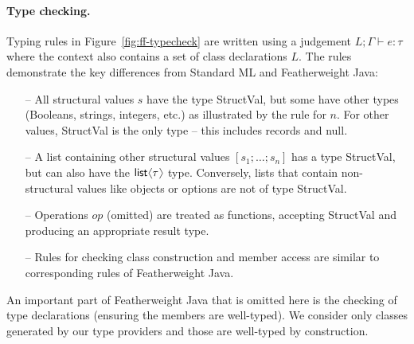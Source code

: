 \documentclass[10pt,preprint,blind,clearpagebib]{sigplanconf}
\newcommand{\langl}{\begin{picture}(4.5,7)
\put(1.1,2.5){\rotatebox{60}{\line(1,0){5.5}}}
\put(1.1,2.5){\rotatebox{300}{\line(1,0){5.5}}}
\end{picture}}
\newcommand{\rangl}{\begin{picture}(4.5,7)
\put(.9,2.5){\rotatebox{120}{\line(1,0){5.5}}}
\put(.9,2.5){\rotatebox{240}{\line(1,0){5.5}}}
\end{picture}}
\newcommand{\kvd}[1]{\textnormal{\textcolor{kvdclr}{\sffamily #1}}}
\newcommand{\ident}[1]{\textnormal{\sffamily #1}}
\begin{document}
\paragraph{Type checking.} 
Typing rules in Figure~\ref{fig:ff-typecheck} are written using a judgement
$L; \Gamma \vdash e : \tau$ where the context also contains a set of class declarations $L$.
The rules demonstrate the key differences from Standard ML and Featherweight Java:
%
\begin{itemize}
\item[--] All structural values $s$ have the type \ident{StructVal}, but some have other types
  (Booleans, strings, integers, etc.) as illustrated by the rule for $n$.
  For other values, \ident{StructVal} is the only type -- this includes records and \kvd{null}.
\item[--] A list containing other structural values $[s_1; \ldots; s_n]$ has a type \ident{StructVal},
  but can also have the $\ident{list}\langl\tau\rangl$ type. Conversely, lists that contain
  non-structural values like objects or options are not of type \ident{StructVal}.
\item[--] Operations $op$ (omitted) are treated as functions, accepting 
  \ident{StructVal} and producing an appropriate result type.
\item[--] Rules for checking class construction and member access are similar to corresponding
  rules of Featherweight Java.  
\end{itemize}
%
An important part of Featherweight Java that is omitted here is the checking of type declarations
(ensuring the members are well-typed). We consider only classes generated by our type providers 
and those are well-typed by construction.

\end{document}
